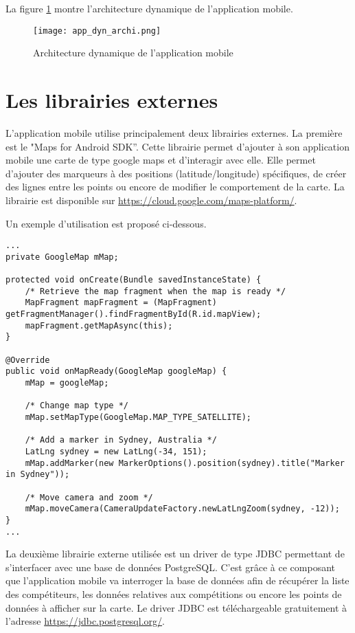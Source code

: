 La figure \ref{fig:app_dyn_archi} montre l'architecture dynamique de l'application mobile. 

\begin{figure}[htb]
\centering 
\texttt{[image: app\_dyn\_archi.png]} 
\caption{Architecture dynamique de l'application mobile}
\label{fig:app_dyn_archi}
\end{figure}

\section{Les librairies externes}

L'application mobile utilise principalement deux librairies externes. La première est le "Maps for Android SDK”. Cette librairie permet d'ajouter à son application mobile une carte de type google maps et d'interagir avec elle. Elle permet d'ajouter des marqueurs à des positions (latitude/longitude) spécifiques, de créer des lignes entre les points ou encore de modifier le comportement de la carte. La librairie est disponible sur \url{https://cloud.google.com/maps-platform/}.

Un exemple d'utilisation est proposé ci-dessous.


\begin{lstlisting}[style=JavaStyle]
...
private GoogleMap mMap;

protected void onCreate(Bundle savedInstanceState) {
	/* Retrieve the map fragment when the map is ready */
	MapFragment mapFragment = (MapFragment) getFragmentManager().findFragmentById(R.id.mapView);
	mapFragment.getMapAsync(this);
}

@Override
public void onMapReady(GoogleMap googleMap) {
	mMap = googleMap;

	/* Change map type */
	mMap.setMapType(GoogleMap.MAP_TYPE_SATELLITE);

	/* Add a marker in Sydney, Australia */
	LatLng sydney = new LatLng(-34, 151);
	mMap.addMarker(new MarkerOptions().position(sydney).title("Marker in Sydney"));

	/* Move camera and zoom */
	mMap.moveCamera(CameraUpdateFactory.newLatLngZoom(sydney, -12));
}
...
\end{lstlisting}

La deuxième librairie externe utilisée est un driver de type JDBC permettant de s'interfacer avec une base de données PostgreSQL. C'est grâce à ce composant que l'application mobile va interroger la base de données afin de récupérer la liste des compétiteurs, les données relatives aux compétitions ou encore les points de données à afficher sur la carte. Le driver JDBC est téléchargeable gratuitement à l'adresse \url{https://jdbc.postgresql.org/}.


